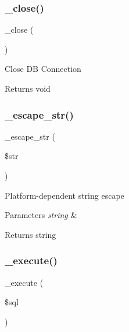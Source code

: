 \subsubsection{\texorpdfstring{\+\_\+close()}{\_close()}}
{\footnotesize\ttfamily \+\_\+close (\begin{DoxyParamCaption}{ }\end{DoxyParamCaption})\hspace{0.3cm}{\ttfamily [protected]}}

Close DB Connection

\begin{DoxyReturn}{Returns}
void 
\end{DoxyReturn}
\mbox{\label{class_c_i___d_b__sqlite3__driver_af8ef0237bfcdb19215b63fff769e7a55}} 
\subsubsection{\texorpdfstring{\+\_\+escape\+\_\+str()}{\_escape\_str()}}
{\footnotesize\ttfamily \+\_\+escape\+\_\+str (\begin{DoxyParamCaption}\item[{}]{\$str }\end{DoxyParamCaption})\hspace{0.3cm}{\ttfamily [protected]}}

Platform-\/dependent string escape


\begin{DoxyParams}{Parameters}
{\em string} & \\
\hline
\end{DoxyParams}
\begin{DoxyReturn}{Returns}
string 
\end{DoxyReturn}
\mbox{\label{class_c_i___d_b__sqlite3__driver_a114ab675d89bf8324a41785fb475e86d}} 
\subsubsection{\texorpdfstring{\+\_\+execute()}{\_execute()}}
{\footnotesize\ttfamily \+\_\+execute (\begin{DoxyParamCaption}\item[{}]{\$sql }\end{DoxyParamCaption})\hspace{0.3cm}{\ttfamily [protected]}}

